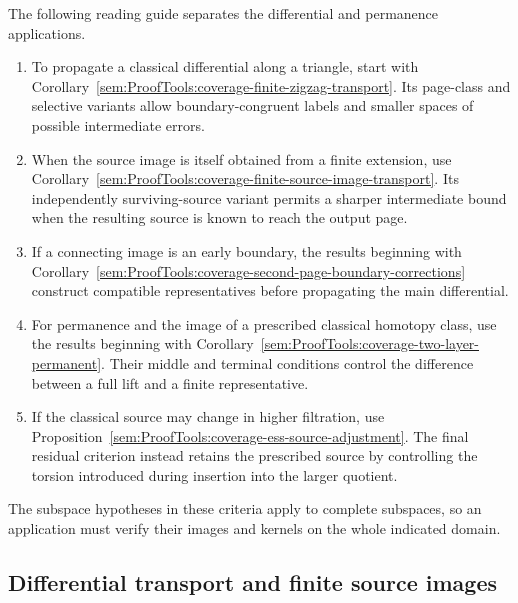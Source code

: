 The following reading guide separates the differential and permanence
applications.
\begin{enumerate}
\item To propagate a classical differential along a triangle, start with
Corollary~\ref{sem:ProofTools:coverage-finite-zigzag-transport}. Its
page-class and selective variants allow boundary-congruent labels and
smaller spaces of possible intermediate errors.
\item When the source image is itself obtained from a finite extension,
use Corollary~\ref{sem:ProofTools:coverage-finite-source-image-transport}.
Its independently surviving-source variant permits a sharper intermediate
bound when the resulting source is known to reach the output page.
\item If a connecting image is an early boundary, the results beginning
with Corollary~\ref{sem:ProofTools:coverage-second-page-boundary-corrections}
construct compatible representatives before propagating the main
differential.
\item For permanence and the image of a prescribed classical homotopy
class, use the results beginning with
Corollary~\ref{sem:ProofTools:coverage-two-layer-permanent}. Their
middle and terminal conditions control the difference between a full
lift and a finite representative.
\item If the classical source may change in higher filtration, use
Proposition~\ref{sem:ProofTools:coverage-ess-source-adjustment}. The final
residual criterion instead retains the prescribed source by controlling
the torsion introduced during insertion into the larger quotient.
\end{enumerate}
The subspace hypotheses in these criteria apply to complete subspaces,
so an application must verify their images and kernels on the whole
indicated domain.

\subsection{Differential transport and finite source images}

